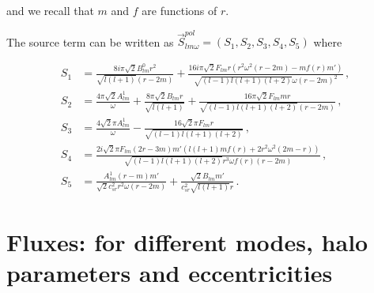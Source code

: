 \documentclass[11pt]{article}
\begin{document}
and we recall that $m$ and $f$ are functions of $r$.

The source term can be written as $\vec S^{pol}_{lm\omega}=(S_1,S_2,S_3,S_4,S_5)$ where

\begin{equation}\label{source_polar}
    \begin{aligned}
        S_1&=\frac{8 i \pi  \sqrt{2} B_{lm}^{0} r^2}{\sqrt{l (l+1)} (r-2 m)}+\frac{16 i \pi  \sqrt{2} F_{lm} r \left(r^2 \omega ^2 (r-2 m)-m f(r) m'\right)}{\sqrt{(l-1) l (l+1) (l+2)} \omega  (r-2 m)^2}\,,\\
        S_2&=\frac{4 \pi  \sqrt{2} A_{lm}^{1}}{\omega }+\frac{8 \pi  \sqrt{2} B_{lm} r}{\sqrt{l (l+1)}}+\frac{16 \pi  \sqrt{2} F_{lm} m r}{\sqrt{(l-1) l (l+1) (l+2)} (r-2 m)}\,,\\
        S_3&=\frac{4 \sqrt{2} \pi  A_{lm}^{1}}{\omega }-\frac{16 \sqrt{2} \pi  F_{lm} r}{\sqrt{(l-1) l (l+1) (l+2)}}\,,\\
        S_4&=\frac{2 i \sqrt{2} \pi  F_{lm} (2 r-3 m) m' \left(l (l+1) m f(r)+2 r^2 \omega ^2 (2 m-r)\right)}{\sqrt{(l-1) l (l+1) (l+2)} r^3 \omega  f(r) (r-2 m)}\,,\\
        S_5&=\frac{A_{lm}^{1} (r-m) m'}{\sqrt{2} c_{sr}^2 r^2 \omega  (r-2 m)}+\frac{\sqrt{2} B_{lm} m'}{c_{sr}^2 \sqrt{l (l+1)} r}\,.
    \end{aligned}
\end{equation}
\newpage

\section{Fluxes: for different modes, halo parameters and eccentricities}\label{apenteu1}
\end{document}
